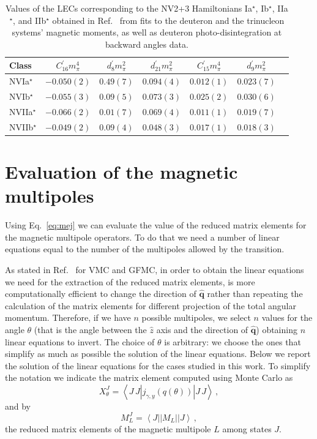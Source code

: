 \documentclass[aps,prc,floatfix,showpacs,twocolumn, preprintnumbers]{revtex4-2}
\newcommand{\beq}{\begin{equation}}
\newcommand{\eeq}{\end{equation}}
\def\beq{\begin{equation}}
\def\eeq{\end{equation}}
\begin{document}
\begin{table}
  \begin{center}
    \begin{tabular}{lcccccc}
      \hline\hline
        Class  & $C_{16}^\prime m_\pi^4$ & $d_8^\prime m_\pi^2$ & $d_{21}^\prime m_\pi^2$ & $C_{15}^\prime m_\pi^4$  & $d_9^\prime m_\pi^2$ \\ 
      \hline
        NVIa$^\star$  & $-0.050(2)$ & $0.49(7)$ & $0.094(4)$ & $0.012(1)$ & $0.023(7)$\\
      \hline
        NVIb$^\star$  & $-0.055(3)$ & $0.09(5)$ & $0.073(3)$ & $0.025(2)$ & $ 0.030(6)$  \\
      \hline
        NVIIa$^\star$ & $-0.066(2)$ & $0.01(7)$ & $0.069(4)$ & $0.011(1)$ & $0.019(7)$ \\
      \hline
        NVIIb$^\star$ & $-0.049(2)$ & $0.09(4)$ & $0.048(3)$ & $0.017(1)$ & $0.018(3)$ \\
      \hline\hline
    \end{tabular}
    \caption{\label{tab:fitNV} Values of the
      LECs corresponding to the NV2+3 Hamiltonians Ia$^\star$, Ib$^\star$, IIa$^\star$, and IIb$^\star$ obtained in Ref.~\cite{Gnech:2022vwr} from fits to the deuteron and the trinucleon systems' magnetic moments, as well as deuteron photo-disintegration at backward angles data.}
  \end{center}
\end{table}








\section{Evaluation of the magnetic multipoles}
\label{sec:app1}
Using Eq.~\eqref{eq:mej} we can evaluate the value of the reduced matrix elements for the magnetic multipole operators. To do that we need a number of linear equations equal to the number of the multipoles allowed by the transition. 

As stated in Ref.~\cite{Carlson2015} for VMC and GFMC, in order to obtain the linear equations we need for the extraction of the reduced matrix elements, 
is more computationally efficient to change the direction of $\hat{\bm{q}}$ rather than repeating the calculation of the matrix elements for different projection of the total angular momentum. 
Therefore, if we have $n$ possible multipoles, we select $n$ values for the angle $\theta$ (that is the angle between the $\hat z$ axis and the direction of $\hat{\bm{q}}$) obtaining $n$ linear equations to invert. The choice of $\theta$ is arbitrary: we choose the ones that simplify as much as possible the solution of the linear equations. Below we report the solution of the linear equations for the cases studied in this work. To simplify the notation we indicate the matrix element computed using Monte Carlo as
\beq
X_\theta^J=\left\langle J\, J \left|{j}_{\gamma,y}(q(\theta))\right| J\,J  \right\rangle\,,
\eeq
and by
\beq
M_L^J=\left\langle J ||M_L|| J  \right\rangle\,,
\eeq
the reduced matrix elements of the magnetic multipole $L$ among states $J$.
\end{document}
